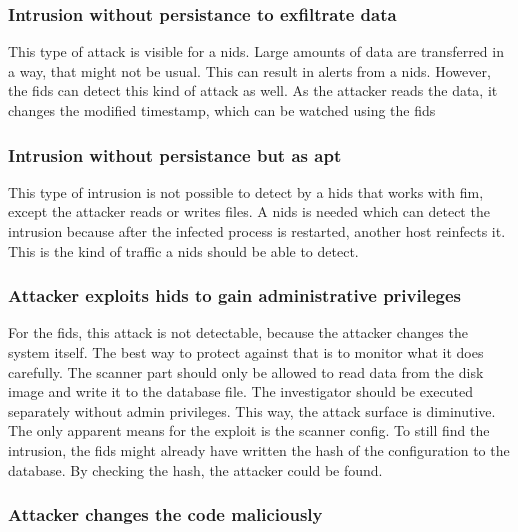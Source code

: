 \subsubsection{Intrusion without persistance to exfiltrate data}
\label{sec:defense:nopersistanceexfiltration}

This type of attack is visible for a \gls{nids}. Large amounts of data are transferred in a way, that might not be usual. This can result in alerts from a \gls{nids}. However, the \gls{fids} can detect this kind of attack as well. As the attacker reads the data, it changes the modified timestamp, which can be watched using the \gls{fids}

\subsubsection{Intrusion without persistance but as apt}
\label{sec:defense:nopersistanceapt}

This type of intrusion is not possible to detect by a \gls{hids} that works with \gls{fim}, except the attacker reads or writes files. A \gls{nids} is needed which can detect the intrusion because after the infected process is restarted, another host reinfects it. This is the kind of traffic a \gls{nids} should be able to detect.

\subsubsection{Attacker exploits \gls{hids} to gain administrative privileges}
\label{sec:defense:exploitforroot}

For the \gls{fids}, this attack is not detectable, because the attacker changes the system itself. The best way to protect against that is to monitor what it does carefully. The scanner part should only be allowed to read data from the disk image and write it to the database file. The investigator should be executed separately without admin privileges. This way, the attack surface is diminutive. The only apparent means for the exploit is the scanner config. To still find the intrusion, the \gls{fids} might already have written the hash of the configuration to the database. By checking the hash, the attacker could be found. 

\subsubsection{Attacker changes the code maliciously}
\label{sec:defense:codechange}

